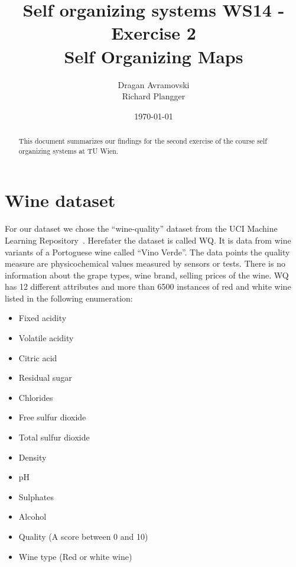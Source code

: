 \documentclass{acm_proc_article-sp}
\begin{document}
\title{Self organizing systems WS14 - Exercise 2\\
       Self Organizing Maps}%

\author{
\alignauthor
Dragan Avramovski\\
\alignauthor
Richard Plangger\\
}

\date{\today}

\maketitle

\begin{abstract}
    This document summarizes our findings for the second exercise
    of the course self organizing systems at TU Wien.
\end{abstract}


\section{Wine dataset}

For our dataset we chose the ``wine-quality'' dataset from the UCI Machine Learning Repository~\cite{ucirepo}. 
Herefater the dataset is called WQ.
It is data from wine variants of a Portoguese wine called ``Vino Verde''.
The data points the quality measure are physicochemical values measured
by sensors or tests. There is no information about the grape types,
wine brand, selling prices of the wine.
WQ has 12 different attributes and more than 6500 instances of red and white wine listed in the following enumeration:

\begin{itemize}
    \item Fixed acidity
    \item Volatile acidity
    \item Citric acid
    \item Residual sugar
    \item Chlorides
    \item Free sulfur dioxide
    \item Total sulfur dioxide
    \item Density
    \item pH
    \item Sulphates
    \item Alcohol
    \item Quality (A score between 0 and 10)
    \item Wine type (Red or white wine)
\end{itemize}
\end{document}
